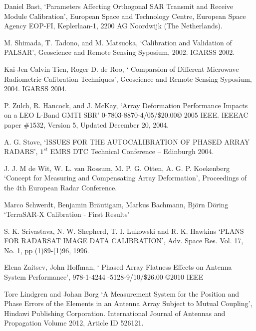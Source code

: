 \documentclass[a4paper,10pt]{article}
\begin{document}
\begin{enumerate}[ {[}1{]} ]
		\item \label{ppr:classic5} Daniel Bast, \enquote*{Parameters Affecting 
		Orthogonal SAR Transmit and Receive Module Calibration}, European Space
		and Technology Centre, European Space Agency EOP-FI, Keplerlaan-1, 2200
		AG Noordwijk (The Netherlands).
		
		\item \label{ppr:puncTrgt3} M. Shimada, T. Tadono, and M. Matsuoka,
		\enquote*{Calibration and Validation of PALSAR}, Geoscience and Remote 
		Sensing Syposium, 2002. IGARSS 2002.
		
		\item \label{ppr:rad6} Kai-Jen Calvin Tien, Roger D. de Roo, \enquote*{
		Comparsion of Different Microwave Radiometric Calibration Techniques}, 
		Geoscience and Remote Sensing Syposium, 2004. IGARSS 2004.
		
		\item \label{ppr:aligment3} P. Zulch, R. Hancock, and J. McKay, 
		\enquote*{Array Deformation Performance Impacts on a LEO L-Band GMTI 
		SBR} 0-7803-8870-4/05/\$20.00© 2005 IEEE. IEEEAC paper \#1532, Version 
		5, Updated December 20, 2004.

		\item \label{ppr:classic6} A. G. Stove, \enquote*{ISSUES FOR THE 
		AUTOCALIBRATION OF PHASED ARRAY RADARS}, $1^{st}$ EMRS DTC Technical 
		Conference – Edinburgh 2004.
		
		\item \label{ppr:aligment4} J. J. M de Wit, W. L. van Rossum, M. P. G. 
		Otten, A. G. P. Koekenberg \enquote*{Concept for Measuring and 
		Compensating Array Deformation}, Proceedings of the 4th European Radar 
		Conference.
		
		\item \label{ppr:rad7} Marco Schwerdt, Benjamin Bräutigam, Markus 
		Bachmann, Björn Döring \enquote*{TerraSAR-X Calibration - First Results}

		\item \label{ppr:classic-ext1} S. K. Srivastava, N. W. Shepherd, T. I. 
		Lukowski and R. K. Hawkins \enquote*{PLANS FOR RADARSAT IMAGE DATA
		CALIBRATION}, Adv. Space Res. Vol. 17, No. 1, pp (1)89-(1)96, 1996.

		\item \label{ppr:aligment5} Elena Zaitsev, John Hoffman, \enquote*{
		Phased Array Flatness Effects on Antenna System Performance}, 978-1-4244
		-5128-9/10/\$26.00 \copyright 2010 IEEE

		
		\item Tore Lindgren and Johan Borg \enquote*{A Measurement System for 
		the Position and Phase Errors of the Elements in an Antenna Array 
		Subject to Mutual Coupling}, Hindawi Publishing Corporation. 
		International Journal of Antennas and Propagation Volume 2012, 
		Article ID 526121.


\end{enumerate}
\end{document}
